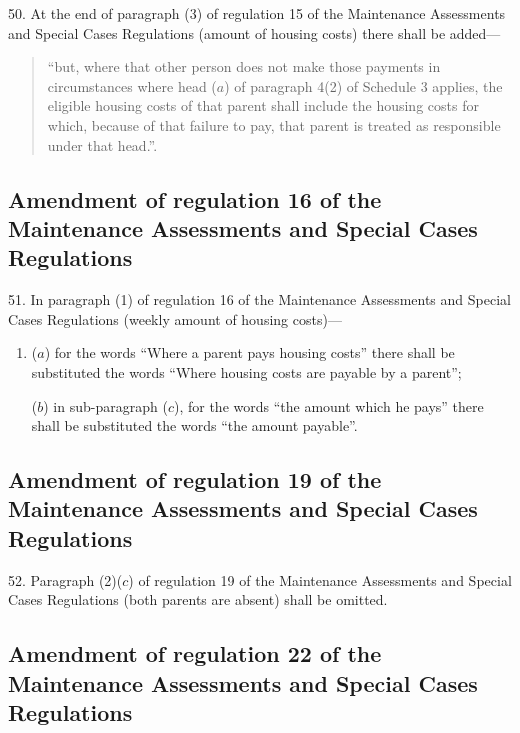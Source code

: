 \documentclass[12pt,a4paper]{article}
\begin{document}
50.  At the end of paragraph (3) of regulation 15 of the Maintenance Assessments and Special Cases Regulations (amount of housing costs) there shall be added—
\begin{quotation}
“but, where that other person does not make those payments in circumstances where head ($a$) of paragraph 4(2) of Schedule 3 applies, the eligible housing costs of that parent shall include the housing costs for which, because of that failure to pay, that parent is treated as responsible under that head.”.
\end{quotation}

\subsection[51. Amendment of regulation 16 of the Maintenance Assessments and Special Cases Regulations]{Amendment of regulation 16 of the Maintenance Assessments and Special Cases Regulations}

51.  In paragraph (1) of regulation 16 of the Maintenance Assessments and Special Cases Regulations (weekly amount of housing costs)—
\begin{enumerate}\item[]
($a$) for the words “Where a parent pays housing costs” there shall be substituted the words “Where housing costs are payable by a parent”;

($b$) in sub-paragraph ($c$), for the words “the amount which he pays” there shall be substituted the words “the amount payable”.
\end{enumerate}

\subsection[52. Amendment of regulation 19 of the Maintenance Assessments and Special Cases Regulations]{Amendment of regulation 19 of the Maintenance Assessments and Special Cases Regulations}

52.  Paragraph (2)($c$) of regulation 19 of the Maintenance Assessments and Special Cases Regulations (both parents are absent) shall be omitted.

\subsection[53. Amendment of regulation 22 of the Maintenance Assessments and Special Cases Regulations]{Amendment of regulation 22 of the Maintenance Assessments and Special Cases Regulations}
\end{document}
